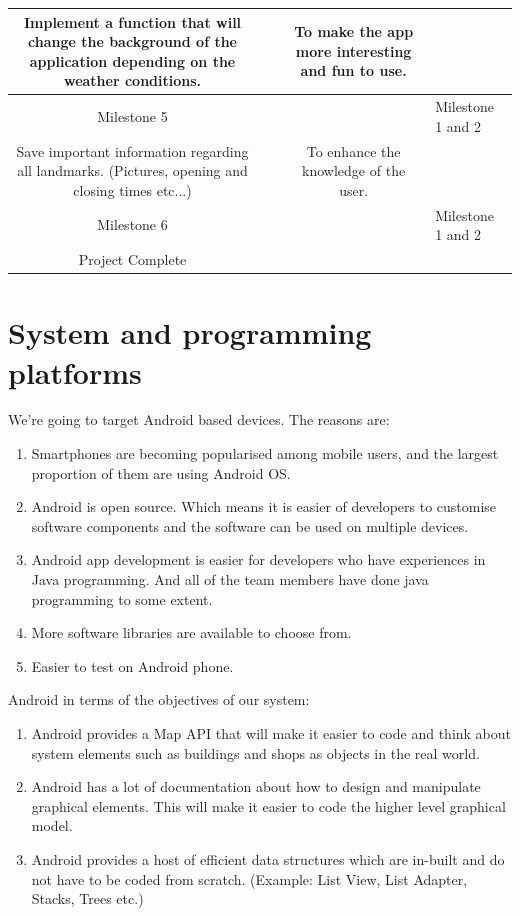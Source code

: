 \documentclass[10pt,a4paper,oneside]{report}
\begin{document}
\begin{table}[H]
\begin{tabularx}{1.3\textwidth}{ |S|E|S|E| }
  Implement a function that will change the background of the application depending on the weather conditions. & ~ & To make the app more interesting and fun to use. & ~ \\ \hline
  Milestone 5 & ~ & ~ & Milestone 1 and 2 \\ \hline
  Save important information regarding all landmarks. (Pictures, opening and closing times etc...) & ~ & To enhance the knowledge of the user. & ~ \\ \hline
  Milestone 6 & ~ & ~ & Milestone 1 and 2 \\ \hline
  Project Complete & ~ & ~ & ~ \\ \hline
\end{tabularx}
\end{table}

\section*{System and programming platforms}
We're going to target Android based devices. The reasons are:
\begin{enumerate}
\item{Smartphones are becoming popularised among mobile users, and the largest proportion of them are using Android OS.}
\item{Android is open source. Which means it is easier of developers to customise software components and the software can be used on multiple devices.}
\item{Android app development is easier for developers who have experiences in Java programming.  And all of the team members have done java programming to some extent.}
\item{More software libraries are available to choose from.}
\item{Easier to test on Android phone.}
\end{enumerate}

Android in terms of the objectives of our system:
\begin{enumerate}
\item{Android provides a Map API that will make it easier to code and think about system elements such as buildings and shops as objects in the real world.}
\item{Android has a lot of documentation about how to design and manipulate graphical elements. This will make it easier to code the higher level graphical model.}
\item{Android provides a host of efficient data structures which are in-built and do not have to be coded from scratch. (Example: List View, List Adapter, Stacks, Trees etc.)}
\end{enumerate}
\end{document}
